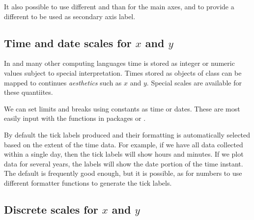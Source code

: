 \documentclass[krantz2]{krantz}\usepackage{knitr}%
\begin{document}
It also possible to use different  and  than for the main axes, and to provide a different  to be used as secondary axis label.

\begin{knitrout}\footnotesize
{}\color{fgcolor}\begin{kframe}
\begin{alltt}
  \hlstd{(} \hlstd{=} \hlstd{(}\hlopt{~}   \hlstd{=} \hlstd{,}  \hlstd{=} \hlstd{()))}
\end{alltt}
\end{kframe}
\end{knitrout}

\subsection{Time and date scales for $x$ and $y$}\label{sec:plot:scales:time:date}
In \Rlang and many other computing languages time is stored as integer or numeric values subject to special interpretation. Times stored as objects of class  can be mapped to continues \emph{aesthetics} such as $x$ and $y$. Special scales are available for these quantiites.

We can set limits and breaks using constants as time or dates. These are most easily input with the functions in packages  or .


By default the tick labels produced and their formatting is automatically selected based on the extent of the time data. For example, if we have all data collected within a single day, then the tick labels will show hours and minutes. If we plot data for several years, the labels will show the date portion of the time instant. The default is frequently good enough, but it is possible, as for numbers to use different formatter functions to generate the tick labels.


\subsection{Discrete scales for $x$ and $y$}
\end{document}

